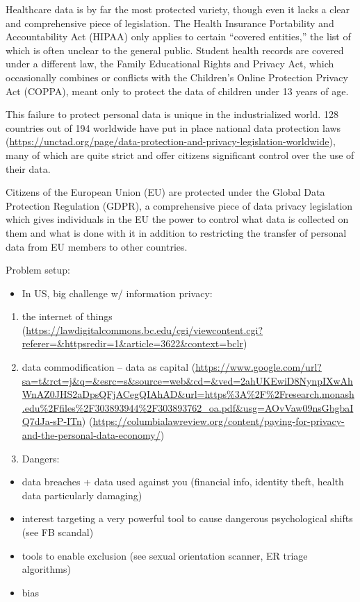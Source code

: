 \documentclass[water,article,submit,moreauthors,pdftex]{mdpi}
\providecommand{\tightlist}{%
  \setlength{\itemsep}{0pt}\setlength{\parskip}{4pt}}
\begin{document}
Healthcare data is by far the most protected variety, though even it
lacks a clear and comprehensive piece of legislation. The Health
Insurance Portability and Accountability Act (HIPAA) only applies to
certain ``covered entities,'' the list of which is often unclear to the
general public. Student health records are covered under a different
law, the Family Educational Rights and Privacy Act, which occasionally
combines or conflicts with the Children's Online Protection Privacy Act
(COPPA), meant only to protect the data of children under 13 years of
age.

This failure to protect personal data is unique in the industrialized
world. 128 countries out of 194 worldwide have put in place national
data protection laws
(\url{https://unctad.org/page/data-protection-and-privacy-legislation-worldwide}),
many of which are quite strict and offer citizens significant control
over the use of their data.

Citizens of the European Union (EU) are protected under the Global Data
Protection Regulation (GDPR), a comprehensive piece of data privacy
legislation which gives individuals in the EU the power to control what
data is collected on them and what is done with it in addition to
restricting the transfer of personal data from EU members to other
countries.

Problem setup:

\begin{itemize}
\tightlist
\item
  In US, big challenge w/ information privacy:
\end{itemize}

\begin{enumerate}
\def\labelenumi{\arabic{enumi}.}
\item
  the internet of things
  (\url{https://lawdigitalcommons.bc.edu/cgi/viewcontent.cgi?referer=\&httpsredir=1\&article=3622\&context=bclr})
\item
  data commodification -- data as capital
  (\url{https://www.google.com/url?sa=t\&rct=j\&q=\&esrc=s\&source=web\&cd=\&ved=2ahUKEwiD8NynpIXwAhWnAZ0JHS2aDpsQFjACegQIAhAD\&url=https\%3A\%2F\%2Fresearch.monash.edu\%2Ffiles\%2F303893944\%2F303893762_oa.pdf\&usg=AOvVaw09nsGbgbaIQ7dJa-sP-ITn})
  (\url{https://columbialawreview.org/content/paying-for-privacy-and-the-personal-data-economy/})
\item
  Dangers:
\end{enumerate}

\begin{itemize}
\tightlist
\item
  data breaches + data used against you (financial info, identity theft,
  health data particularly damaging)
\item
  interest targeting a very powerful tool to cause dangerous
  psychological shifts (see FB scandal)
\item
  tools to enable exclusion (see sexual orientation scanner, ER triage
  algorithms)
\item
  bias
\end{itemize}
\end{document}
